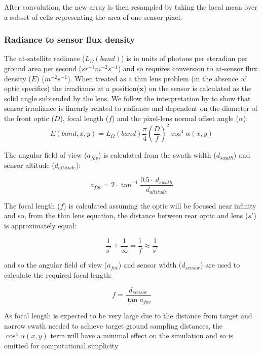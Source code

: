\documentclass[10pt,a4paper,final,twocolumn]{article}
\begin{document}
After convolution, the new array is then resampled by taking the local mean over a subset of cells representing the area of one sensor pixel.

\subsubsection{Radiance to sensor flux density}
The at-satellite radiance ($L_{\Omega}(band)$) is in units of photons per steradian per ground area per second ($sr^{-1} m^{-2} s^{-1}$) and so requires conversion to at-sensor flux density ($E$) ($m^{-2} s^{-1}$). When treated as a thin lens problem (in the absence of optic specifics) the irradiance at a position($\textbf{x}$) on the sensor is calculated as the solid angle subtended by the lens. We follow the interpretation by \cite{Sato1999} to show that sensor irradiance is linearly related to radiance and dependent on the diameter of the front optic ($D$), focal length ($f$) and the pixel-lens normal offset angle ($\alpha$):
\begin{equation}
E(band, x, y) = L_{\Omega}(band) \frac{\pi}{4} \left(\frac{D}{f}\right)^{2} \cos^4 \alpha(x,y)
\label{eqn1}
\end{equation}

The angular field of view ($a_{fov}$) is calculated from the swath width ($d_{swath}$) and sensor altitude ($d_{altitude}$):

\begin{equation}
a_{fov} = 2\cdot \tan^{-1}\frac{0.5\cdot~d_{swath}}{d_{altitude}}
\end{equation}

The focal length ($f$) is calculated assuming the optic will be focused near infinity and so, from the thin lens equation, the distance between rear optic and lens ($s\prime$) is approximately equal:

\begin{equation}
\frac{1}{s^\prime} + \frac{1}{\infty} = \frac{1}{f} \approx \frac{1}{s^\prime}
\end{equation}

and so the angular field of view ($a_{fov}$) and sensor width ($d_{sensor}$) are used to calculate the required focal length:

\begin{equation}
f= \frac{d_{sensor}}{\tan a_{fov}}
\end{equation}

As focal length is expected to be very large due to the distance from target and narrow swath needed to achieve target ground sampling distances, the $\cos^4\alpha(x, y)$ term will have a minimal effect on the simulation and so is omitted for computational simplicity
\end{document}
